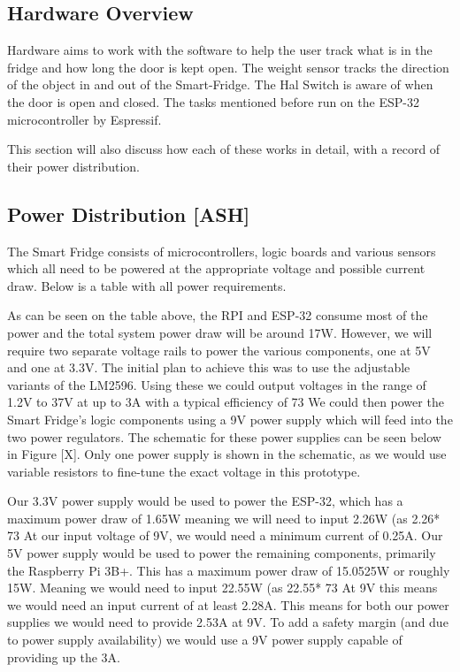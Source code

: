 \subsection{Hardware Overview}

Hardware aims to work with the software to help the user track what is in the fridge and how long the door is kept open.
The weight sensor tracks the direction of the object in and out of the Smart-Fridge.
The Hal Switch is aware of when the door is open and closed.
The tasks mentioned before run on the ESP-32 microcontroller by Espressif.


This section will also discuss how each of these works in detail, with a record of their power distribution.


\subsection{Power Distribution [ASH]}

The Smart Fridge consists of microcontrollers, logic boards and various sensors which all need to be powered at the appropriate voltage and possible current draw.
Below is a table with all power requirements.




As can be seen on the table above, the RPI and ESP-32 consume most of the power and the total system power draw will be around 17W.
However, we will require two separate voltage rails to power the various components, one at 5V and one at 3.3V.
The initial plan to achieve this was to use the adjustable variants of the LM2596.
Using these we could output voltages in the range of 1.2V to 37V at up to 3A with a typical efficiency of 73%
We could then power the Smart Fridge's logic components using a 9V power supply which will feed into the two power regulators.
The schematic for these power supplies can be seen below in Figure [X].
Only one power supply is shown in the schematic, as we would use variable resistors to fine-tune the exact voltage in this prototype.


Our 3.3V power supply would be used to power the ESP-32, which has a maximum power draw of 1.65W meaning we will need to input 2.26W (as 2.26* 73%
At our input voltage of 9V, we would need a minimum current of 0.25A.
Our 5V power supply would be used to power the remaining components, primarily the Raspberry Pi 3B+.
This has a maximum power draw of 15.0525W or roughly 15W.
Meaning we would need to input 22.55W (as 22.55* 73%
At 9V this means we would need an input current of at least 2.28A.
This means for both our power supplies we would need to provide 2.53A at 9V.
To add a safety margin (and due to power supply availability) we would use a 9V power supply capable of providing up the 3A.



